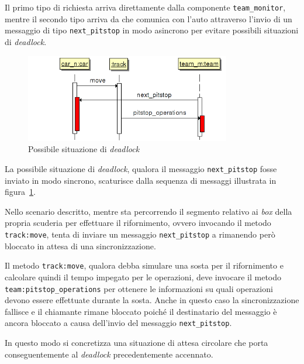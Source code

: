 Il primo tipo di richiesta arriva direttamente dalla componente \texttt{team\_monitor}, mentre il secondo tipo arriva da \team{} che comunica con l'auto attraverso l'invio di un messaggio di tipo \texttt{next\_pitstop} in modo asincrono per evitare possibili situazioni di \textit{deadlock}.

\begin{figure}
\begin{center}
\includegraphics[width=0.8\textwidth]{diagrammi/PitstopDeadlock}
\caption{Possibile situazione di \textit{deadlock}}
\label{fig:pitstopDeadlock}
\end{center}
\end{figure}

La possibile situazione di \textit{deadlock}, qualora il messaggio \texttt{next\_pitstop} fosse inviato in modo sincrono, scaturisce dalla sequenza di messaggi illustrata in figura~\ref{fig:pitstopDeadlock}.

Nello scenario descritto, mentre \car{} sta percorrendo il segmento relativo ai \textit{box} della propria scuderia per effettuare il rifornimento, ovvero invocando il metodo \texttt{track:move}, \team{} tenta di inviare un messaggio \texttt{next\_pitstop} a \car{} rimanendo però bloccato in attesa di una sincronizzazione.

Il metodo \texttt{track:move}, qualora debba simulare una sosta per il rifornimento e calcolare quindi il tempo impegato per le operazioni, deve invocare il metodo \texttt{team:pitstop\_operations} per ottenere le informazioni su quali operazioni devono essere effettuate durante la sosta. Anche in questo caso la sincronizzazione fallisce e il chiamante rimane bloccato poiché il destinatario del messaggio è ancora bloccato a causa dell'invio del messaggio \texttt{next\_pitstop}.

In questo modo si concretizza una situazione di attesa circolare che porta conseguentemente al \textit{deadlock} precedentemente accennato.

